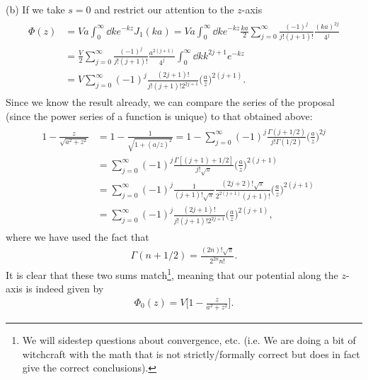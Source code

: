 {(b) If we take $s = 0$ and restrict our attention to the $z$-axis
\begin{eqnarray}
\begin{aligned}
    \Phi(z) &= Va \int_{0}^{\infty} \dd{k} e^{-kz} J_1(ka) = Va \int_{0}^{\infty} \dd{k} e^{-kz} \frac{ka}{2} \sum_{j=0}^{\infty} \frac{(-1)^{j}}{j! (j+1)!} \frac{(ka)^{2j}}{4^{j}} \\
            &= \frac{V}{2} \sum_{j=0}^{\infty} \frac{(-1)^{j}}{j!(j+1)!} \frac{a^{2(j+1)}}{4^{j}} \int_{0}^{\infty} \dd{k} k^{2j+1} e^{-kz} \\
            &= V \sum_{j=0}^{\infty} (-1)^{j}\frac{(2j+1)!}{j!(j+1)!2^{2j+1}} \Big( \frac{a}{z} \Big)^{2(j+1)}
.\end{aligned}
\end{eqnarray}
Since we know the result already, we can compare the series of the proposal (since the power series of a function is unique) to that obtained above:
\begin{eqnarray}
\begin{aligned}
    1 - \frac{z}{\sqrt{a^2 + z^2}} &= 1 - \frac{1}{\sqrt{1 + (a/z)^2}} = 1 - \sum_{j=0}^{\infty} (-1)^{j} \frac{\Gamma(j+1/2)}{j! \Gamma(1/2)} \Big( \frac{a}{z} \Big)^{2j} \\
    &= \sum_{j=0}^{\infty} (-1)^{j} \frac{\Gamma[(j+1)+1/2]}{j!\sqrt{\pi}} \Big( \frac{a}{z} \Big)^{2(j+1)} \\
    &= \sum_{j=0}^{\infty} (-1)^{j} \frac{1}{(j+1)!\sqrt{\pi}} \frac{(2j+2)!\sqrt{\pi}}{2^{2(j+1)}(j+1)!} \Big( \frac{a}{z} \Big)^{2(j+1)} \\
    &= \sum_{j=0}^{\infty} (-1)^{j} \frac{(2j+1)!}{j!(j+1)! 2^{2j+1}} \Big( \frac{a}{z} \Big)^{2(j+1)}
,\end{aligned}
\end{eqnarray}
where we have used the fact that 
\begin{eqnarray}
    \Gamma(n+1/2) = \frac{(2n)!\sqrt{\pi}}{2^{2n}n!}
.\end{eqnarray}
It is clear that these two sums match\footnote{We will sidestep questions about convergence, etc. (i.e. We are doing a bit of witchcraft with the math that is not strictly/formally correct but does in fact give the correct conclusions).}, meaning that our potential along the $z$-axis is indeed given by
\begin{eqnarray}
    \Phi_0(z) = V \Big[ 1 - \frac{z}{a^2 + z^2} \Big]
.\end{eqnarray}

}










